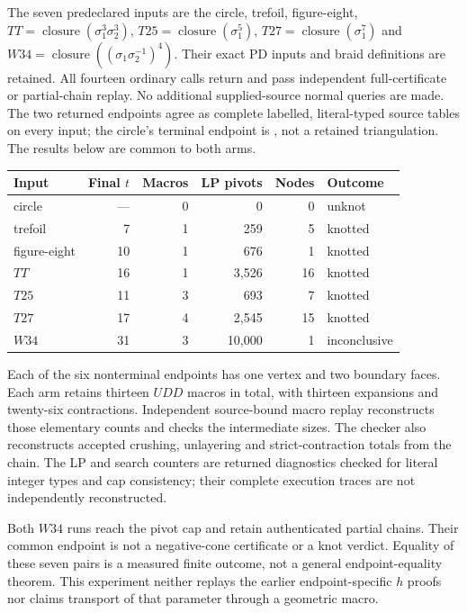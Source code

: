 The seven predeclared inputs are the circle, trefoil, figure-eight,
$TT=\operatorname{closure}(\sigma_1^3\sigma_2^3)$,
$T25=\operatorname{closure}(\sigma_1^5)$,
$T27=\operatorname{closure}(\sigma_1^7)$ and
$W34=\operatorname{closure}((\sigma_1\sigma_2^{-1})^4)$.
Their exact PD inputs and braid definitions are retained.  All fourteen
ordinary calls return and pass independent full-certificate or
partial-chain replay.  No additional supplied-source normal queries
are made.  The two returned endpoints agree as complete labelled,
literal-typed source tables on every input; the circle's terminal
endpoint is , not a retained triangulation.  The results
below are common to both arms.
\begin{center}
\begin{tabular}{lrrrrl}
\hline
Input & Final $t$ & Macros & LP pivots & Nodes & Outcome\\
\hline
circle & --- & 0 & 0 & 0 & unknot\\
trefoil & 7 & 1 & 259 & 5 & knotted\\
figure-eight & 10 & 1 & 676 & 1 & knotted\\
$TT$ & 16 & 1 & 3,526 & 16 & knotted\\
$T25$ & 11 & 3 & 693 & 7 & knotted\\
$T27$ & 17 & 4 & 2,545 & 15 & knotted\\
$W34$ & 31 & 3 & 10,000 & 1 & inconclusive\\
\hline
\end{tabular}
\end{center}
Each of the six nonterminal endpoints has one vertex and two boundary
faces.  Each arm retains thirteen $UDD$ macros in total, with thirteen
expansions and twenty-six contractions.  Independent source-bound
macro replay reconstructs those elementary counts and checks the
intermediate sizes.  The checker also reconstructs accepted crushing,
unlayering and strict-contraction totals from the chain.  The LP and
search counters are returned diagnostics checked for literal integer
types and cap consistency; their complete execution traces are not
independently reconstructed.

Both $W34$ runs reach the pivot cap and retain authenticated partial
chains.  Their common endpoint is not a negative-cone certificate or a
knot verdict.  Equality of these seven pairs is a measured finite
outcome, not a general endpoint-equality theorem.  This experiment
neither replays the earlier endpoint-specific $h$ proofs nor claims
transport of that parameter through a geometric macro.

